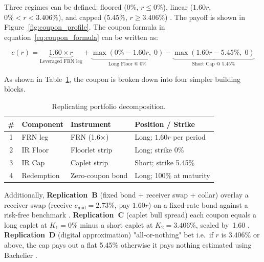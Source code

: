 \documentclass[11pt,a4paper]{article}
\begin{document}
\noindent Three regimes can be defined: floored (0\%, $r\le0\%$), linear ($1.60r$, $0\%<r<3.406\%$), and capped (5.45\%, $r\ge3.406\%$) \parencite[Ch.~29]{Hull2022}. The payoff is shown in Figure~\ref{fig:coupon_profile}. The coupon formula in
equation~\eqref{eq:coupon_formula} can be written as:

\begin{equation}
  c(r) = \underbrace{1.60 \times r}_{\text{Leveraged FRN leg}}
       + \underbrace{\max(0\% - 1.60r,\; 0)}_{\text{Long Floor @ 0\%}}
       - \underbrace{\max(1.60r - 5.45\%,\; 0)}_{\text{Short Cap @ 5.45\%}}
  \label{eq:decomposition}
\end{equation}

As shown in Table~\ref{tab:decomposition}, the coupon is broken down into four simpler building blocks.

\begin{table}
  \vspace{-12pt}
  \centering\scriptsize
  \setlength{\tabcolsep}{3pt}
  \begin{tabular}{@{}clp{2.1cm}p{2.6cm}@{}}
    \toprule
    \textbf{\#} & \textbf{Component} & \textbf{Instrument} &
    \textbf{Position / Strike} \\
    \midrule
    1 & FRN leg   & FRN (1.6$\times$)
      & Long; $1.60r$ per period \\
    2 & IR Floor  & Floorlet strip
      & Long; strike 0\% \\
    3 & IR Cap    & Caplet strip
      & Short; strike 5.45\% \\
    4 & Redemption & Zero-coupon bond
      & Long; 100\% at maturity \\
    \bottomrule
  \end{tabular}
  \vspace{1pt}
  \caption{Replicating portfolio decomposition.}
  \label{tab:decomposition}
  \vspace{-10pt}
\end{table}

Additionally, \textbf{Replication~B} (fixed bond + receiver swap + collar) \parencite{BrigoMercurio2006,Hull2022} overlay a receiver swap
(receive $c_{\text{mid}} = 2.73\%$, pay $1.60r$) on a fixed-rate bond against a risk-free benchmark
\parencite[Ch.~6]{BrigoMercurio2006}.
\textbf{Replication~C} (caplet bull spread) each coupon equals a long caplet at
$K_1 = 0\%$ minus a short caplet at $K_2 = 3.406\%$, scaled by~1.60
\parencite[Ch.~20]{Hull2022}.
\textbf{Replication~D} (digital approximation) "all-or-nothing" bet i.e.\ if $r$ is 3.406\% or above, the cap pays out a flat 5.45\% otherwise it pays nothing estimated using Bachelier \parencite[Ch.~26]{Hull2022}.
\end{document}
